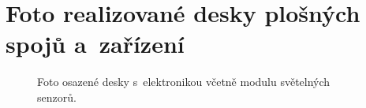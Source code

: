\chapter{Foto realizované desky plošných spojů a~zařízení}
\begin{figure}[h]
	\centering
	\quad
	\caption{Foto osazené desky s~elektronikou včetně modulu světelných senzorů.}
	\label{fig_finalPCB}
\end{figure}



